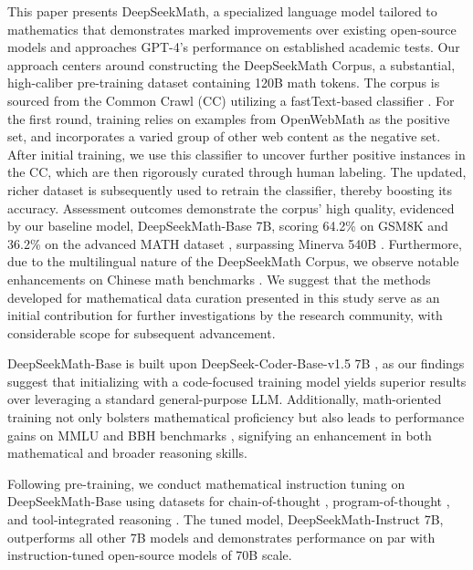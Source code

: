 This paper presents DeepSeekMath, a specialized language model tailored to mathematics that demonstrates marked improvements over existing open-source models and approaches GPT-4’s performance on established academic tests. Our approach centers around constructing the DeepSeekMath Corpus, a substantial, high-caliber pre-training dataset containing 120B math tokens. The corpus is sourced from the Common Crawl (CC) utilizing a fastText-based classifier \citep{joulin2016fasttext}. For the first round, training relies on examples from OpenWebMath \citep{openwebmath} as the positive set, and incorporates a varied group of other web content as the negative set. After initial training, we use this classifier to uncover further positive instances in the CC, which are then rigorously curated through human labeling. The updated, richer dataset is subsequently used to retrain the classifier, thereby boosting its accuracy. Assessment outcomes demonstrate the corpus’ high quality, evidenced by our baseline model, DeepSeekMath-Base 7B, scoring 64.2\% on GSM8K \citep{gsm8k} and 36.2\% on the advanced MATH dataset \citep{MATH}, surpassing Minerva 540B \citep{minerva}. Furthermore, due to the multilingual nature of the DeepSeekMath Corpus, we observe notable enhancements on Chinese math benchmarks \citep{wei2023cmath,agieval}. We suggest that the methods developed for mathematical data curation presented in this study serve as an initial contribution for further investigations by the research community, with considerable scope for subsequent advancement.

DeepSeekMath-Base is built upon DeepSeek-Coder-Base-v1.5 7B \citep{deepseek-coder}, as our findings suggest that initializing with a code-focused training model yields superior results over leveraging a standard general-purpose LLM. Additionally, math-oriented training not only bolsters mathematical proficiency but also leads to performance gains on MMLU \citep{mmlu} and BBH benchmarks \citep{bbh}, signifying an enhancement in both mathematical and broader reasoning skills.

Following pre-training, we conduct mathematical instruction tuning on DeepSeekMath-Base using datasets for chain-of-thought \citep{cot}, program-of-thought \citep{pot,pal}, and tool-integrated reasoning \citep{tora}. The tuned model, DeepSeekMath-Instruct 7B, outperforms all other 7B models and demonstrates performance on par with instruction-tuned open-source models of 70B scale.

